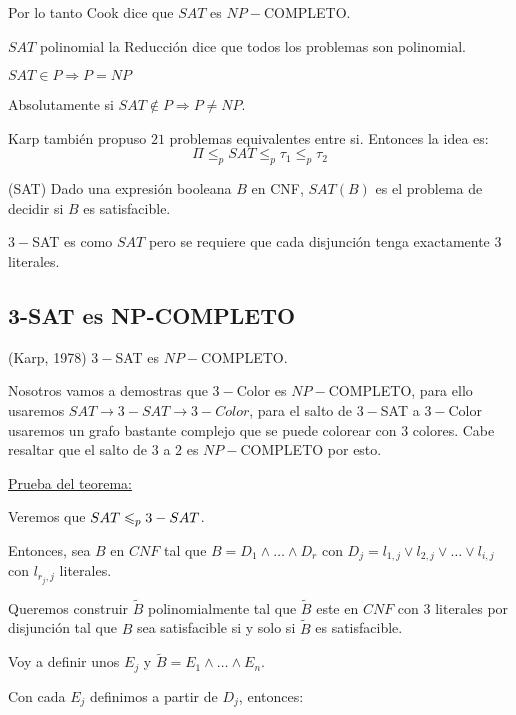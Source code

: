 \documentclass[12pt,a4paper]{article}
\begin{document}
Por lo tanto Cook dice que $SAT$ es $NP-$COMPLETO.
\medskip

$SAT$ polinomial la Reducción dice que todos los problemas son polinomial.

\begin{corolario}
    $SAT \in P \Rightarrow P = NP$
\end{corolario}

Absolutamente si $SAT \notin P \Rightarrow P \neq NP$.
\medskip

Karp también propuso $21$ problemas equivalentes entre si. Entonces la idea es:
$$\Pi \leq_{p} SAT \leq_{p} \tau_{1} \leq_{p} \tau_{2}$$

\begin{definition} (SAT) Dado una expresión booleana $B$ en CNF, $SAT(B)$ es el
    problema de decidir si $B$ es satisfacible.
\end{definition}

$3-$SAT es como $SAT$ pero se requiere que cada disjunción tenga exactamente $3$ 
literales.

\subsection{3-SAT es NP-COMPLETO}
\begin{teorema} (Karp, 1978) $3-$SAT es $NP-$COMPLETO.
\end{teorema}

Nosotros vamos a demostras que $3-$Color es $NP-$COMPLETO, para ello usaremos 
$SAT \to 3-SAT \to 3-Color$, para el salto de $3-$SAT a $3-$Color usaremos 
un grafo bastante complejo que se puede colorear con $3$ colores. Cabe resaltar 
que el salto de $3$ a $2$ es $NP-$COMPLETO por esto.
\medskip

\underline{Prueba del teorema:}
\medskip

Veremos que $SAT \leqslant_{p} 3-SAT$.
\medskip

Entonces, sea $B$ en $CNF$ tal que $B = D_{1} \wedge \ldots \wedge D_{r}$ con 
$D_{j} = l_{1,j} \vee l_{2,j} \vee \ldots \vee l_{i,j}$ con $l_{r_{j},j}$ literales.
\medskip

Queremos construir $\widetilde{B}$ polinomialmente tal que $\widetilde{B}$ este en
$CNF$ con $3$ literales por disjunción tal que $B$ sea satisfacible si y solo si 
$\widetilde{B}$ es satisfacible.
\medskip

Voy a definir unos $E_{j}$ y $\widetilde{B} = E_{1} \wedge \ldots \wedge E_{n}$.
\medskip

Con cada $E_{j}$ definimos a partir de $D_{j}$, entonces:
\medskip
\end{document}
